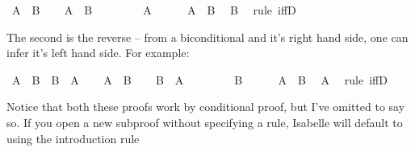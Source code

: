 \begin{isabellebody}
\ {\isachardoublequoteopen}A\ {\isasymlongleftrightarrow}\ B{\isachardoublequoteclose}\isanewline
\ \ \isamarkupfalse%
\ {\isachardoublequoteopen}A\ {\isasymlongrightarrow}\ B{\isachardoublequoteclose}\isanewline
\ \ \isamarkupfalse%
\isanewline
\ \ \ \ \isamarkupfalse%
\ {\isachardoublequoteopen}A{\isachardoublequoteclose}\isanewline
\ \ \ \ \isamarkupfalse%
\ {\isacharbackquoteopen}A\ {\isasymlongleftrightarrow}\ B{\isacharbackquoteclose}\ \isamarkupfalse%
\ {\isachardoublequoteopen}B{\isachardoublequoteclose}\ \isamarkupfalse%
\ {\isacharparenleft}rule\ iffD{}{\isacharparenright}\isanewline
\ \ \isamarkupfalse%
\isanewline
{}\isamarkupfalse%
%
\endisatagproof
{\isafoldproof}%
%
\isadelimproof
%
\endisadelimproof
%
\begin{isamarkuptext}%
The second is the reverse -- from a biconditional and it's right hand side, one can infer
it's left hand side. For example:%
\end{isamarkuptext}\isamarkuptrue%
\isamarkupfalse%
\ {\isachardoublequoteopen}{\isacharparenleft}A\ {\isasymlongleftrightarrow}\ B{\isacharparenright}\ {\isasymlongrightarrow}\ B\ {\isasymlongrightarrow}\ A{\isachardoublequoteclose}\isanewline
%
\isadelimproof
%
\endisadelimproof
%
\isatagproof
{}\isamarkupfalse%
\isanewline
\ \ \isamarkupfalse%
\ {\isachardoublequoteopen}A\ {\isasymlongleftrightarrow}\ B{\isachardoublequoteclose}\isanewline
\ \ \isamarkupfalse%
\ {\isachardoublequoteopen}B\ {\isasymlongrightarrow}\ A{\isachardoublequoteclose}\isanewline
\ \ \isamarkupfalse%
\isanewline
\ \ \ \ \isamarkupfalse%
\ {\isachardoublequoteopen}B{\isachardoublequoteclose}\isanewline
\ \ \ \ \isamarkupfalse%
\ {\isacharbackquoteopen}A\ {\isasymlongleftrightarrow}\ B{\isacharbackquoteclose}\ \isamarkupfalse%
\ {\isachardoublequoteopen}A{\isachardoublequoteclose}\ \isamarkupfalse%
\ {\isacharparenleft}rule\ iffD{}{\isacharparenright}\isanewline
\ \ \isamarkupfalse%
\isanewline
{}\isamarkupfalse%
%
\endisatagproof
{\isafoldproof}%
%
\isadelimproof
%
\endisadelimproof
%
\begin{isamarkuptext}%
Notice that both these proofs work by conditional proof, but I've omitted to say so. If you
open a new subproof without specifying a rule, Isabelle will default to using the introduction rule

\end{isamarkuptext}
\end{isabellebody}
